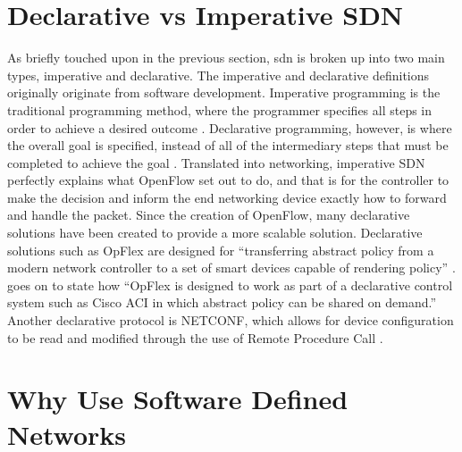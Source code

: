 
\section{Declarative vs Imperative SDN}
\label{litreview:declarativevsimperative}
As briefly touched upon in the
previous section, \gls{sdn} is broken up into two main types, imperative and
declarative. The imperative and declarative definitions originally originate from
software development. Imperative programming is the traditional programming
method, where the programmer specifies all steps in order to achieve a desired
outcome \citep{LATIF2020102563}. Declarative programming, however, is where the overall goal is
specified, instead of all of the intermediary steps that must be completed to
achieve the goal  \citep{LATIF2020102563}. Translated into networking,
imperative SDN perfectly explains what OpenFlow set out to do, and that is for
the controller to make the decision and inform the end networking device
exactly how to forward and handle the packet. Since the creation of OpenFlow,
many declarative solutions have been created to provide a more scalable
solution. Declarative solutions such as OpFlex are designed for ``transferring
abstract policy from a modern network controller to a set of smart devices
capable of rendering policy'' \citep{bhardwaj_2020}. \citeauthor{bhardwaj_2020}
goes on to state how ``OpFlex is designed to work as part of a declarative
control system such as Cisco ACI in which abstract policy can be shared on
demand.'' Another declarative protocol is NETCONF, which allows for device
configuration to be read and modified through the use of Remote Procedure Call
\citep{LATIF2020102563}.

\section{Why Use Software Defined Networks}
\label{litreview:overview}

